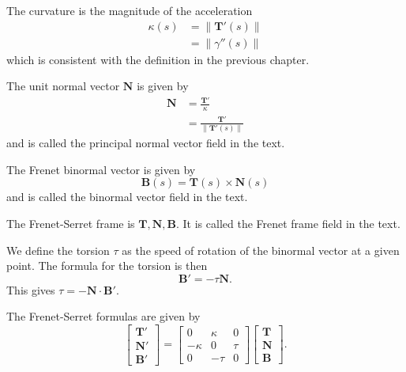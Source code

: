 \documentclass{book}
\begin{document}
		The curvature is the magnitude of the acceleration
		\begin{align}
			\kappa(s)&=\|\mathbf{T}'(s)\|\\
			&=\|\gamma''(s)\|
		\end{align}
		which is consistent with the definition in the previous chapter.
		
		The unit normal vector $\mathbf{N}$ is given by 
		\begin{align}
			\mathbf{N}&=\frac{\mathbf{T}'}{\kappa}\\
			&=\frac{\mathbf{T}'}{\|\mathbf{T}'(s)\|}
		\end{align}
		and is called the principal normal vector field in the text.
		
		The Frenet binormal vector is given by
		\begin{equation}
			\mathbf{B}(s)=\mathbf{T}(s)\times\mathbf{N}(s)
		\end{equation}
		and is called the binormal vector field in the text.
		
		The Frenet-Serret frame is ${\mathbf{T},\mathbf{N},\mathbf{B}}$. It is called the Frenet frame field in the text.
		
		We define the torsion $\tau$ as the speed of rotation of the binormal vector at a given point. The formula for the torsion is then
		\begin{equation}
			\mathbf{B}'=-\tau\mathbf{N}\mathrm{.}
		\end{equation}
		This gives $\tau=-\mathbf{N}\cdot\mathbf{B}'$.
		
		The Frenet-Serret formulas are given by
		\begin{equation}
			\begin{bmatrix}
				\mathbf{T}'\\
				\mathbf{N}'\\
				\mathbf{B}'
			\end{bmatrix}=
			\begin{bmatrix}
				0 & \kappa & 0\\
				-\kappa & 0 & \tau\\
				0 & -\tau & 0
			\end{bmatrix}
			\begin{bmatrix}
				\mathbf{T}\\
				\mathbf{N}\\
				\mathbf{B}
			\end{bmatrix}\mathrm{.}
		\end{equation}
		
\end{document}
